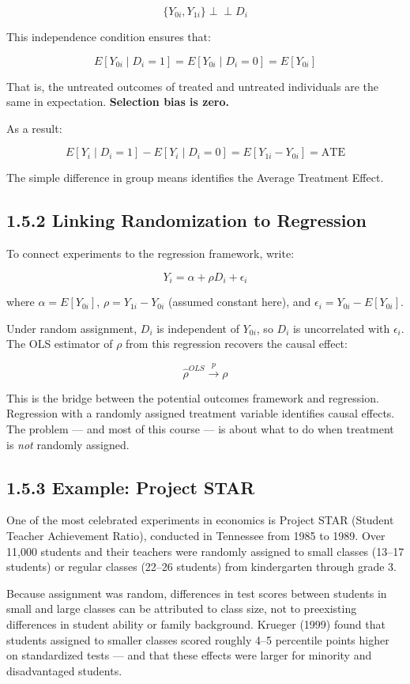 \[
\{Y_{0i}, Y_{1i}\} \perp\!\!\!\perp D_i
\]

This independence condition ensures that:

\[
E[Y_{0i} \mid D_i = 1] = E[Y_{0i} \mid D_i = 0] = E[Y_{0i}]
\]

That is, the untreated outcomes of treated and untreated individuals are the same in expectation. \textbf{Selection bias is zero.}

As a result:

\[
E[Y_i \mid D_i = 1] - E[Y_i \mid D_i = 0] = E[Y_{1i} - Y_{0i}] = \text{ATE}
\]

The simple difference in group means identifies the Average Treatment Effect.

\subsection{1.5.2 Linking Randomization to Regression}

To connect experiments to the regression framework, write:

\[
Y_i = \alpha + \rho D_i + \epsilon_i
\]

where $\alpha = E[Y_{0i}]$, $\rho = Y_{1i} - Y_{0i}$ (assumed constant here), and $\epsilon_i = Y_{0i} - E[Y_{0i}]$.

Under random assignment, $D_i$ is independent of $Y_{0i}$, so $D_i$ is uncorrelated with $\epsilon_i$. The OLS estimator of $\rho$ from this regression recovers the causal effect:

\[
\hat{\rho}^{OLS} \xrightarrow{p} \rho
\]

This is the bridge between the potential outcomes framework and regression. Regression with a randomly assigned treatment variable identifies causal effects. The problem --- and most of this course --- is about what to do when treatment is \textit{not} randomly assigned.

\subsection{1.5.3 Example: Project STAR}

One of the most celebrated experiments in economics is Project STAR (Student Teacher Achievement Ratio), conducted in Tennessee from 1985 to 1989. Over 11,000 students and their teachers were randomly assigned to small classes (13--17 students) or regular classes (22--26 students) from kindergarten through grade 3.

Because assignment was random, differences in test scores between students in small and large classes can be attributed to class size, not to preexisting differences in student ability or family background. Krueger (1999) found that students assigned to smaller classes scored roughly 4--5 percentile points higher on standardized tests --- and that these effects were larger for minority and disadvantaged students.

